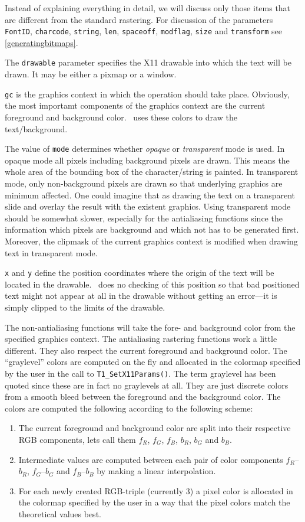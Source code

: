 Instead of explaining everything in detail, we will discuss only those items
that are different from the standard rastering. For discussion of the
parameters \verb+FontID+, \verb+charcode+, \verb+string+, \verb+len+,
\verb+spaceoff+, \verb+modflag+, \verb+size+ and \verb+transform+ see
\ref{generatingbitmaps}. 

The \verb+drawable+ parameter specifies the X11 drawable into which the text
will be drawn. It may be either a pixmap or a window.

\verb+gc+ is the graphics context in which the operation should take
place. Obviously, the most importamt components of the graphics context are the
current foreground and background color. \tonelib\ uses these colors to draw
the text/background. 

The value of \verb+mode+ determines whether {\em opaque} or {\em transparent}
mode is used. In opaque mode all pixels including background pixels are
drawn. This means the whole area of the bounding box of the character/string
is painted. In transparent mode, only non-background pixels are drawn so that
underlying graphics are minimum affected. One could imagine that as drawing the
text on a transparent slide and overlay the result with the existent
graphics. Using transparent mode should be somewhat slower, especially for the
antialiasing functions since the information which pixels are background and
which not has to be generated first. Moreover, the clipmask of the current
graphics context is modified when drawing text in transparent mode.

\verb+x+ and \verb+y+ define the position coordinates where the origin of the
text will be located in the drawable. \tonelib\ does no checking of this
position so that bad positioned text might not appear at all in the drawable
without getting an error---it is simply clipped to the limits of the
drawable. 

The non-antialiasing functions will take the fore- and background color from 
the specified graphics context. 
The antialiasing rastering functions work a little different. They also
respect the current foreground and background color. The ``graylevel'' colors
are computed on the fly and allocated in the colormap specified by the user in
the call to \verb+T1_SetX11Params()+. The term graylevel has been quoted since
these are in fact no graylevels at all. They are just discrete colors from a
smooth bleed between the foreground and the background color. The colors are
computed the following according to the following scheme: 
\begin{enumerate}
\item The current foreground and background color are split into their
  respective RGB components, lets call them $f_R$, $f_G$, $f_B$, $b_R$, $b_G$
  and $b_B$.
\item Intermediate values are computed between each pair of color components
  $f_R$--$b_R$, $f_G$--$b_G$ and $f_B$--$b_B$ by making a linear
  interpolation. 
\item For each newly created RGB-triple (currently 3) a pixel color is
  allocated in the colormap specified by the user in a way that the pixel
  colors match the theoretical values best.
\end{enumerate}


